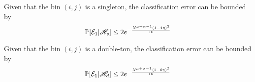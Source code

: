 \begin{lemma}[singleton]
\label{Lem:SingletonClassif}
Given that the bin $(i,j)$ is a singleton, the classification error can be bounded by
\begin{align*}
\mathbb{P}[\mathcal{E}_1|\mathscr{H}_s]\leq 2e^{-\frac{N^{\mu+\alpha-1}(1-4\eta)^2}{16}}
\end{align*}
\end{lemma}
\begin{lemma}
\label{Lem:DoubletonClassif}
Given that the bin $(i,j)$ is a double-ton, the classification error can be bounded by
\begin{align*}
\mathbb{P}[\mathcal{E}_1|\mathscr{H}_d]\leq 2e^{-\frac{N^{\mu+\alpha-1}(1-6\eta)^2}{16}}
\end{align*}
\end{lemma}
